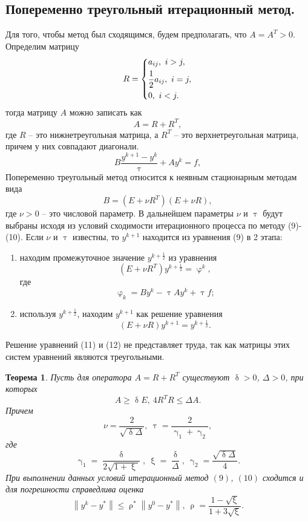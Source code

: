 \documentclass[a4paper, 12pt]{report}
\numberwithin{equation}{section}
\renewcommand{\leq}{\leqslant}
\renewcommand{\geq}{\geqslant}
\renewcommand{\gamma}{\upgamma}
\renewcommand{\delta}{\updelta}
\renewcommand{\varphi}{\upvarphi}
\renewcommand{\tau}{\uptau}
\renewcommand{\xi}{\upxi}
\renewcommand{\rho}{\uprho}
\newcommand\Norm[1]{\left\| #1 \right\|}
\newtheorem*{theorem}{Теорема}
\begin{document}
	\subsection{Попеременно треугольный итерационный метод.}
	Для того, чтобы метод был сходящимся, будем предполагать, что $A = A^T > 0$. Определим матрицу $$R = \begin{dcases}
		a_{ij},\ i>j,\\
		\dfrac 12 a_{ij},\ i = j,\\
		0,\ i < j.
	\end{dcases}$$
	тогда матрицу $A$ можно записать как
	$$A = R + R^T,$$
	где $R$ -- это нижнетреугольная матрица, а $R^T$ -- это верхнетреугольная матрица, причем у них совпадают диагонали. 
	\begin{equation}
		B \dfrac{y^{k+1} - y^k}{\tau} + Ay^{k} = f,
	\end{equation}
	Попеременно треугольный метод относится к неявным стационарным методам вида \begin{equation}
		B = (E + \nu R^T)(E + \nu R),
	\end{equation} где
	$\nu>0$ -- это числовой параметр. В дальнейшем параметры $\nu$ и $\tau$ будут выбраны исходя из условий сходимости итерационного процесса по методу (9)-(10). Если $\nu$ и $\tau$ известны, то $y^{k+1}$ находится из уравнения (9) в 2 этапа:
	\begin{enumerate}
		\item находим промежуточное значение $y^{k+\frac 12}$ из уравнения \begin{equation}
			(E + \nu R^T)y^{k + \frac 12} = \varphi ^k,
		\end{equation}
		где $$\varphi_k = By^k - \tau A y^k + \tau f;$$
		\item используя $y^{k+\frac 12}$, находим $y^{k+1}$ как решение уравнения
		\begin{equation}
			(E + \nu R) y^{k+1}= y^{k+\frac 12}.
		\end{equation}
	\end{enumerate}
	Решение уравнений (11) и (12) не представляет труда, так как матрицы этих систем уравнений являются треугольными.
	\begin{theorem}
		Пусть для оператора $A = R + R^T$ существуют $\delta > 0$, $\Delta > 0$, при которых $$A \geq \delta E,\ 4 R^T R \leq \Delta A.$$
		Причем \begin{equation}
			\nu = \dfrac{2}{\sqrt {\delta \Delta}},\ \tau = \dfrac{2}{\gamma_1 + \gamma_2},
		\end{equation}
		где $$\gamma_1 = \dfrac {\delta}{2\sqrt{1 + \xi}},\ \xi = \dfrac \delta \Delta,\ \gamma_2 = \dfrac{\sqrt{\delta \Delta}}{4}.$$
		При выполнении данных условий итерационный метод $(9)$, $(10)$ сходится и для погрешности справедлива оценка
		$$\Norm{y^k - y^*} \leq \rho^* \Norm{y^0 - y^*},\ \rho = \dfrac{1 - \sqrt \xi}{1 + 3 \sqrt \xi}.$$
	\end{theorem}
\end{document}
